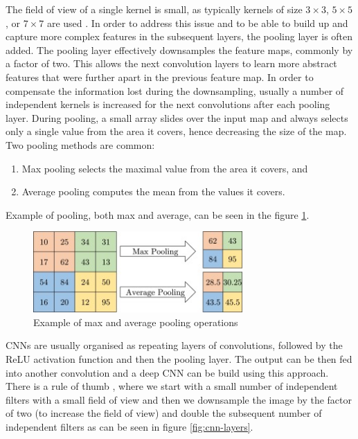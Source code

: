 The field of view of a single kernel is small, as typically kernels of size $3\!\times\!3$, $5\!\times\!5$, or $7\!\times\!7$ are used \cite{Santosh2022-2}. In order to address this issue and to be able to build up and capture more complex features in the subsequent layers, the pooling layer is often added. The pooling layer effectively downsamples the feature maps, commonly by a factor of two. This allows the next convolution layers to learn more abstract features that were further apart in the previous feature map. In order to compensate the information lost during the downsampling, usually a number of independent kernels is increased for the next convolutions after each pooling layer. During pooling, a small array slides over the input map and always selects only a single value from the area it covers, hence decreasing the size of the map. Two pooling methods are common:

\begin{enumerate}
    \item Max pooling selects the maximal value from the area it covers, and
    \item Average pooling computes the mean from the values it covers.
\end{enumerate}

Example of pooling, both max and average, can be seen in the figure \ref{fig:pooling}.

\begin{figure}[H]
\begin{centering}
\includegraphics[width=8cm]{assets/images/pooling.jpg}
\par\end{centering}
\caption{Example of max and average pooling operations \cite{Santosh2022-2}}
\label{fig:pooling}
\end{figure}

CNNs are usually organised as repeating layers of convolutions, followed by the ReLU activation function and then the pooling layer. The output can be then fed into another convolution and a deep CNN can be build using this approach. There is a rule of thumb \cite{Santosh2022-3}, where we start with a small number of independent filters with a small field of view and then we downsample the image by the factor of two (to increase the field of view) and double the subsequent number of independent filters as can be seen in figure \ref{fig:cnn-layers}.

